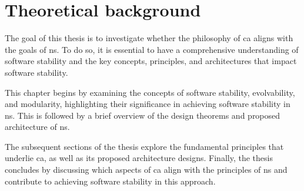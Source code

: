 \chapter{Theoretical background} \label{chap:theoreticalbackground} 

The goal of this thesis is to investigate whether the philosophy of \gls{ca}
aligns with the goals of \gls{ns}. To do so, it is essential to have a
comprehensive understanding of software stability and the key concepts, principles, and
architectures that impact software stability.

This chapter begins by examining the concepts of software stability, evolvability, and
modularity, highlighting their significance in achieving software stability in \gls{ns}.
This is followed by a brief overview of the design theorems and proposed architecture of
\gls{ns}.

The subsequent sections of the thesis explore the fundamental principles that underlie
\gls{ca}, as well as its proposed architecture designs. Finally, the thesis
concludes by discussing which aspects of \gls{ca} align with the principles of
\gls{ns} and contribute to achieving software stability in this approach.
















